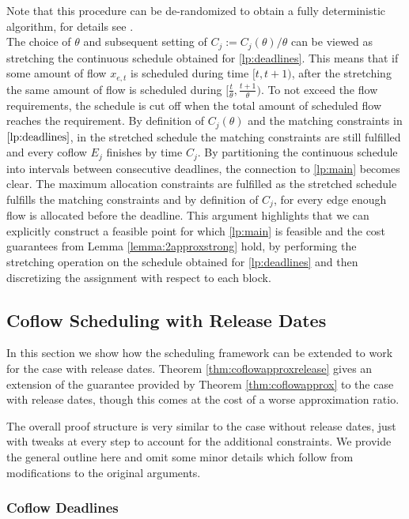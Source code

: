 \documentclass[11pt]{article}
\begin{document}
Note that this procedure can be de-randomized to obtain a fully deterministic algorithm, for details see \cite{im19}.\\

The choice of $\theta$ and subsequent setting of $C_j := C_j(\theta)/\theta$ can be viewed as stretching the continuous schedule obtained for \ref{lp:deadlines}. This means that if some amount of flow $x_{e,t}$ is scheduled during time $[t,t+1)$, after the stretching the same amount of flow is scheduled during $[\frac{t}{\theta},\frac{t+1}{\theta})$. To not exceed the flow requirements, the schedule is cut off when the total amount of scheduled flow reaches the requirement. By definition of $C_j(\theta)$ and the matching constraints in $\ref{lp:deadlines}$, in the stretched schedule the matching constraints are still fulfilled and every coflow $E_j$ finishes by time $C_j$. By partitioning the continuous schedule into intervals between consecutive deadlines, the connection to \ref{lp:main} becomes clear. The maximum allocation constraints are fulfilled as the stretched schedule fulfills the matching constraints and by definition of $C_j$, for every edge enough flow is allocated before the deadline. This argument highlights that we can explicitly construct a feasible point for which \ref{lp:main} is feasible and the cost guarantees from Lemma \ref{lemma:2approxstrong} hold, by performing the stretching operation on the schedule obtained for \ref{lp:deadlines} and then discretizing the assignment with respect to each block.

\subsection{Coflow Scheduling with Release Dates}\label{sec:app:frameworkrelease}
In this section we show how the scheduling framework can be extended to work for the case with release dates. Theorem \ref{thm:coflowapproxrelease} gives an extension of the guarantee provided by Theorem \ref{thm:coflowapprox} to the case with release dates, though this comes at the cost of a worse approximation ratio.

\rsthmcoflowapproxrelease*

The overall proof structure is very similar to the case without release dates, just with tweaks at every step to account for the additional constraints. We provide the general outline here and omit some minor details which follow from modifications to the original arguments.

\subsubsection*{Coflow Deadlines}
\end{document}
